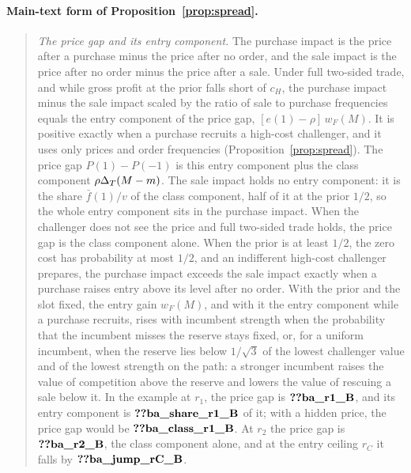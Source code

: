 \paragraph{Main-text form of Proposition~\ref{prop:spread}.}
\begin{quote}
\emph{The price gap and its entry component.} The purchase impact is the price after a purchase minus the price after
no order, and the sale impact is the price after no order minus the price after a sale. Under full two-sided trade,
and while gross profit at the prior falls short of \(c_H\), the purchase impact minus the sale impact scaled by the
ratio of sale to purchase frequencies equals the entry component of the price gap, \([e(1)-\rho]\,w_F(M)\). It is
positive exactly when a purchase recruits a high-cost challenger, and it uses only prices and order frequencies
(Proposition~\ref{prop:spread}). The price gap \(P(1)-P(-1)\) is this entry component plus the class component
\(\rho\Delta_T(M-m)\). The sale impact holds no entry component: it is the share \(\bar f(1)/v\) of the class component,
half of it at the prior \(1/2\), so the whole entry component sits in the purchase impact. When the challenger does
not see the price and full two-sided trade holds, the price gap is the class component alone. When the prior is at
least \(1/2\), the zero cost has probability at most \(1/2\), and an indifferent high-cost challenger prepares, the
purchase impact exceeds the sale impact exactly when a purchase raises entry above its level after no order. With the
prior and the slot fixed, the entry gain \(w_F(M)\), and with it the entry component while a purchase recruits, rises
with incumbent strength when the probability that the incumbent misses the reserve stays fixed, or, for a uniform
incumbent, when the reserve lies below \(1/\sqrt3\) of the lowest challenger value and of the lowest strength on the
path: a stronger incumbent raises the value of competition above the reserve and lowers the value of rescuing a sale
below it. In the example at \(r_1\), the price gap is
\(\reg{ba_r1_B}\), and its entry component is \(\reg{ba_share_r1_B}\) of it; with a hidden price, the price gap would
be \(\reg{ba_class_r1_B}\). At \(r_2\) the price gap is \(\reg{ba_r2_B}\), the class component alone, and at the
entry ceiling \(r_C\) it falls by \(\reg{ba_jump_rC_B}\).
\end{quote}

